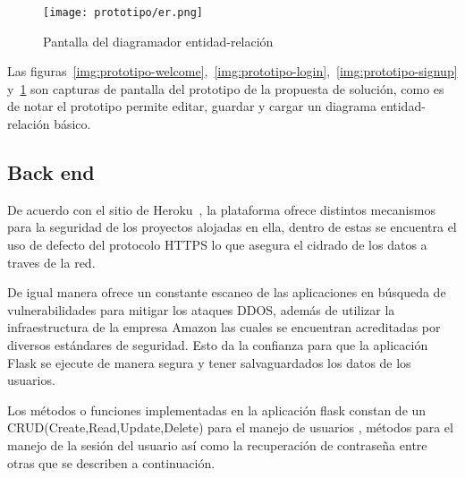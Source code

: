 \begin{figure}[H]
    \centering
    \texttt{[image: prototipo/er.png]}
    \caption{Pantalla del diagramador entidad-relación}
    \label{img:prototipo-er}
\end{figure}



Las figuras~\ref{img:prototipo-welcome},~\ref{img:prototipo-login},~\ref{img:prototipo-signup} y~\ref{img:prototipo-er} son capturas de pantalla del prototipo de la propuesta de solución, como es de notar el prototipo permite editar, guardar y cargar un diagrama entidad-relación básico.


\subsection*{Back end}


De acuerdo con el sitio de Heroku~\cite{heroku_heroku_2020}, la plataforma ofrece distintos mecanismos para la seguridad de los proyectos alojadas en ella, dentro de estas se encuentra el uso de defecto del protocolo HTTPS lo que asegura el cidrado de los datos a traves de la red.


De igual manera ofrece un constante escaneo de las aplicaciones en búsqueda de vulnerabilidades para mitigar los ataques DDOS, además de utilizar la infraestructura de la empresa Amazon las cuales se encuentran acreditadas por diversos estándares de seguridad. Esto da la confianza para que la aplicación Flask se ejecute de manera segura y tener salvaguardados los datos de los usuarios.


Los métodos o funciones implementadas en la aplicación flask constan de un CRUD(Create,Read,Update,Delete) para el manejo de usuarios , métodos para el manejo de la sesión del usuario así como la recuperación de contraseña entre otras que se describen a continuación.

